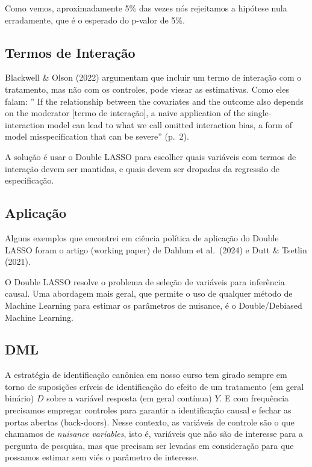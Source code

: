\documentclass[
]{article}
\begin{document}
Como vemos, aproximadamente 5\% das vezes nós rejeitamos a hipótese nula erradamente, que é o esperado do p-valor de 5\%.

\subsection{Termos de Interação}\label{termos-de-interauxe7uxe3o}

Blackwell \& Olson (2022) argumentam que incluir um termo de interação com o tratamento, mas não com os controles, pode viesar as estimativas. Como eles falam: '' If the relationship between the covariates and the outcome also depends on the moderator {[}termo de interação{]}, a naive application of the single-interaction model can lead to what we call omitted interaction bias, a form of model misspecification that can be severe'' (p.~2).

A solução é usar o Double LASSO para escolher quais variáveis com termos de interação devem ser mantidas, e quais devem ser dropadas da regressão de especificação.

\subsection{Aplicação}\label{aplicauxe7uxe3o}

Alguns exemplos que encontrei em ciência política de aplicação do Double LASSO foram o artigo (working paper) de Dahlum et al.~(2024) e Dutt \& Tsetlin (2021).

O Double LASSO resolve o problema de seleção de variáveis para inferência causal. Uma abordagem mais geral, que permite o uso de qualquer método de Machine Learning para estimar os parâmetros de nuisance, é o Double/Debiased Machine Learning.

\subsection{DML}\label{dml}

A estratégia de identificação canônica em nosso curso tem girado sempre em torno de suposições críveis de identificação do efeito de um tratamento (em geral binário) \(D\) sobre a variável resposta (em geral contínua) \(Y\). E com frequência precisamos empregar controles para garantir a identificação causal e fechar as portas abertas (back-doors). Nesse contexto, as variáveis de controle são o que chamamos de \emph{nuisance variables}, isto é, variáveis que não são de interesse para a pergunta de pesquisa, mas que precisam ser levadas em consideração para que possamos estimar sem viés o parâmetro de interesse.
\end{document}
